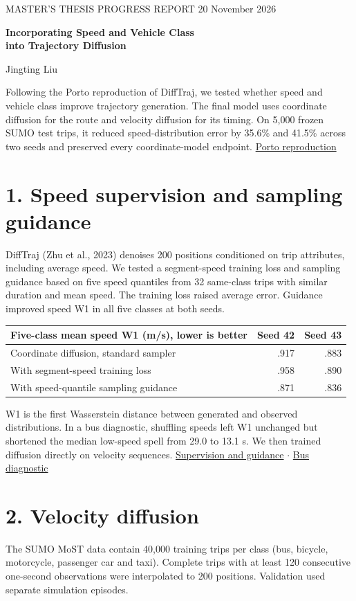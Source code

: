 \documentclass[11pt,a4paper]{article}
\newcommand{\record}[2]{\href{https://github.com/LiuJingting0201/cnr-road-gaf-diffusion/blob/main/docs/results/#1}{#2}}
\begin{document}
{\small MASTER'S THESIS PROGRESS REPORT \hfill 20 November 2026}

{\LARGE\bfseries Incorporating Speed and Vehicle Class\\into Trajectory Diffusion\par}
Jingting Liu

Following the Porto reproduction of DiffTraj, we tested whether speed and vehicle class improve trajectory generation. The final model uses coordinate diffusion for the route and velocity diffusion for its timing. On 5,000 frozen SUMO test trips, it reduced speed-distribution error by 35.6\% and 41.5\% across two seeds and preserved every coordinate-model endpoint. \href{https://github.com/LiuJingting0201/cnr-road-gaf-diffusion/tree/main/deliverables/porto-120-report}{Porto reproduction}

\section*{1. Speed supervision and sampling guidance}
DiffTraj (Zhu et al., 2023) denoises 200 positions conditioned on trip attributes, including average speed. We tested a segment-speed training loss and sampling guidance based on five speed quantiles from 32 same-class trips with similar duration and mean speed. The training loss raised average error. Guidance improved speed W1 in all five classes at both seeds.
\begin{center}\small
\begin{tabular}{lrr}\toprule
Five-class mean speed W1 (m/s), lower is better & Seed 42 & Seed 43\\\midrule
Coordinate diffusion, standard sampler & .917 & .883\\
With segment-speed training loss & .958 & .890\\
With speed-quantile sampling guidance & .871 & .836\\\bottomrule
\end{tabular}\end{center}

W1 is the first Wasserstein distance between generated and observed distributions. In a bus diagnostic, shuffling speeds left W1 unchanged but shortened the median low-speed spell from 29.0 to 13.1 s. We then trained diffusion directly on velocity sequences. \record{general-speed-class/REPORT.md}{Supervision and guidance} $\cdot$ \record{terminal-bus/REPORT.md}{Bus diagnostic}

\section*{2. Velocity diffusion}
The SUMO MoST data contain 40,000 training trips per class (bus, bicycle, motorcycle, passenger car and taxi). Complete trips with at least 120 consecutive one-second observations were interpolated to 200 positions. Validation used separate simulation episodes.
\end{document}
